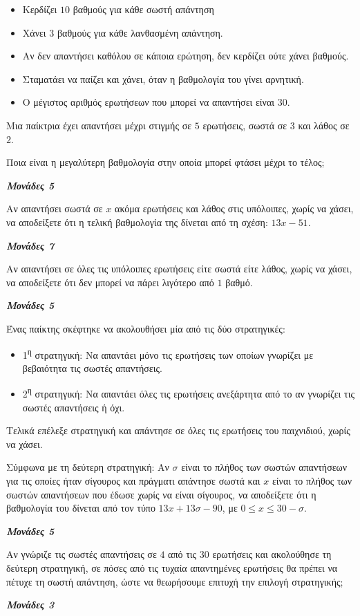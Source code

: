 \documentclass[11pt,a4paper,twoside]{book}
\newcommand{\monades}[1]{
\hspace*{\fill}
\textbf{\textit{\textcolor{maincolor}{Μονάδες #1}}}}
\begin{document}
\begin{itemize}
\item
  Κερδίζει $10$ βαθμούς για κάθε σωστή απάντηση
\item
  Χάνει $3$ βαθμούς για κάθε λανθασμένη απάντηση.
\item
  Αν δεν απαντήσει καθόλου σε κάποια ερώτηση, δεν κερδίζει ούτε χάνει βαθμούς.
\item
  Σταματάει να παίζει και χάνει, όταν η βαθμολογία του γίνει αρνητική.
\item
  Ο μέγιστος αριθμός ερωτήσεων που μπορεί να απαντήσει είναι $30$.
\end{itemize}

\begin{alist}
\item Μια παίκτρια έχει απαντήσει μέχρι στιγμής σε $5$ ερωτήσεις, σωστά σε $3$ και λάθος σε $2$.

\begin{rlist}
\item Ποια είναι η μεγαλύτερη βαθμολογία στην οποία μπορεί φτάσει μέχρι το τέλος;
\monades{5}
\item Αν απαντήσει σωστά σε $x$ ακόμα ερωτήσεις και λάθος στις υπόλοιπες, χωρίς να χάσει, να αποδείξετε ότι η τελική βαθμολογία της δίνεται από τη σχέση: $13x - 51$.
\monades{7}
\item Αν απαντήσει σε όλες τις υπόλοιπες ερωτήσεις είτε σωστά είτε λάθος, χωρίς να χάσει, να αποδείξετε ότι δεν μπορεί να πάρει λιγότερο από $1$ βαθμό.
\monades{5}
\end{rlist}
\item Ένας παίκτης σκέφτηκε να ακολουθήσει μία από τις δύο στρατηγικές:

\begin{itemize}
\item
  1\textsuperscript{η} στρατηγική: Να απαντάει μόνο τις ερωτήσεις των οποίων γνωρίζει με βεβαιότητα τις σωστές απαντήσεις.
\item
  2\textsuperscript{η} στρατηγική: Να απαντάει όλες τις ερωτήσεις ανεξάρτητα από το αν γνωρίζει τις σωστές απαντήσεις ή όχι.
\end{itemize}

Τελικά επέλεξε στρατηγική και απάντησε σε όλες τις ερωτήσεις του παιχνιδιού, χωρίς να χάσει.

\begin{rlist}
\item Σύμφωνα με τη δεύτερη στρατηγική: Αν $\sigma$ είναι το πλήθος των σωστών απαντήσεων για τις οποίες ήταν σίγουρος και πράγματι απάντησε σωστά και $x$ είναι το πλήθος των σωστών απαντήσεων που έδωσε χωρίς να είναι σίγουρος, να αποδείξετε ότι η βαθμολογία του δίνεται από τον τύπο $13x + 13\sigma - 90$, με $0 \leq x \leq 30 - \sigma$.
\monades{5}
\item Αν γνώριζε τις σωστές απαντήσεις σε $4$ από τις $30$ ερωτήσεις και ακολούθησε τη δεύτερη στρατηγική, σε πόσες από τις τυχαία απαντημένες ερωτήσεις θα πρέπει να πέτυχε τη σωστή απάντηση, ώστε να θεωρήσουμε επιτυχή την επιλογή στρατηγικής;
\monades{3}


\end{rlist}
\end{alist}
\end{document}

